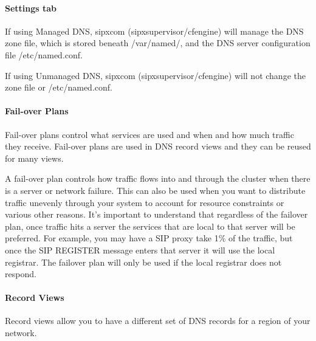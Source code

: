 \documentclass[letterpaper,10pt,english]{sphinxmanual}
\begin{document}
\paragraph{Settings tab}
\label{\detokenize{webui:settings-tab}}
If using Managed DNS, sipxcom (sipxsupervisor/cfengine) will manage the DNS zone file, which is stored beneath /var/named/, and the DNS server configuration file /etc/named.conf.

If using Unmanaged DNS, sipxcom (sipxsupervisor/cfengine) will not change the zone file or /etc/named.conf.
\begin{quote}

\end{quote}


\paragraph{Fail-over Plans}
\label{\detokenize{webui:fail-over-plans}}
Fail-over plans control what services are used and when and how much traffic they receive. Fail-over plans are used in DNS record views and they can be reused for many views.

A fail-over plan controls how traffic flows into and through the cluster when there is a server or network failure.
This can also be used when you want to distribute traffic unevenly through your system to account for resource constraints or various other reasons.
It’s important to understand that regardless of the failover plan, once traffic hits a server the services that are local to that server will be preferred.
For example, you may have a SIP proxy take 1\% of the traffic, but once the SIP REGISTER message enters that server it will use the local registrar.
The failover plan will only be used if the local registrar does not respond.
\begin{quote}

\end{quote}


\paragraph{Record Views}
\label{\detokenize{webui:record-views}}\label{\detokenize{webui:id34}}
Record views allow you to have a different set of DNS records for a region of your network.
\begin{quote}

\end{quote}
\end{document}
